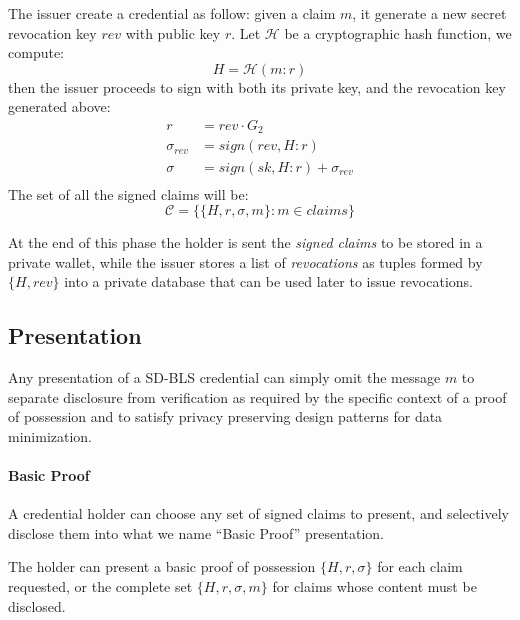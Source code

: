 The issuer create a credential as follow: given a claim $m$, it
generate a new secret revocation key $rev$ with public key $r$. Let
$\mathcal{H}$ be a cryptographic hash function, we compute:
\begin{equation*}
    H = \mathcal{H}(m : r)
\end{equation*}
then the issuer proceeds to sign with both its private key, and the
revocation key generated above:
\begin{equation}\label{rev_agg}
    \begin{split}
        r &= rev \cdot G_2 \\
        \sigma_{rev} &= sign(rev, H : r)\\
        \sigma &= sign(sk, H : r) + \sigma_{rev}\\
   \end{split}
\end{equation}
The set of all the signed claims will be:
\begin{equation*}
   \mathcal{C} = \big\{ \{H, r, \sigma, m \} : m\in claims  \big\}
\end{equation*}

At the end of this phase the holder is sent the \textit{signed claims}
to be stored in a private wallet, while the issuer stores a list of
\textit{revocations} as tuples formed by $\{H,rev\}$ into a private
database that can be used later to issue revocations.

\subsection{Presentation} \label{presentation}

Any presentation of a SD-BLS credential can simply omit the message
$m$ to separate disclosure from verification as required by the
specific context of a proof of possession and to satisfy privacy
preserving design patterns for data minimization.

\paragraph{Basic Proof}

A credential holder can choose any set of signed claims to present,
and selectively disclose them into what we name ``Basic Proof''
presentation.

The holder can present a basic proof of possession $\{ H, r, \sigma
\}$ for each claim requested, or the complete set $\{ H, r, \sigma, m
\}$ for claims whose content must be disclosed.

